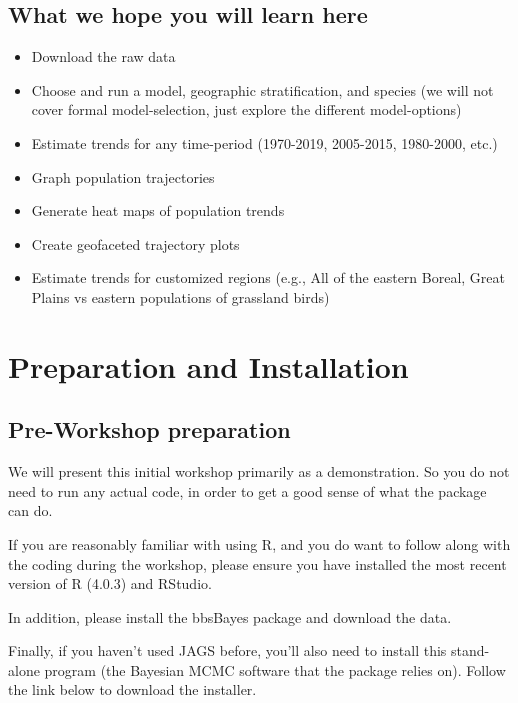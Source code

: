 \documentclass[
]{book}
\begin{document}
\hypertarget{what-we-hope-you-will-learn-here}{%
\section{What we hope you will learn here}\label{what-we-hope-you-will-learn-here}}

\begin{itemize}
\item
  Download the raw data
\item
  Choose and run a model, geographic stratification, and species (we
  will not cover formal model-selection, just explore the different
  model-options)
\item
  Estimate trends for any time-period (1970-2019, 2005-2015,
  1980-2000, etc.)
\item
  Graph population trajectories
\item
  Generate heat maps of population trends
\item
  Create geofaceted trajectory plots
\item
  Estimate trends for customized regions (e.g., All of the eastern
  Boreal, Great Plains vs eastern populations of grassland birds)
\end{itemize}

\hypertarget{Intro}{%
\chapter{Preparation and Installation}\label{Intro}}

\hypertarget{pre-workshop-preparation}{%
\section{Pre-Workshop preparation}\label{pre-workshop-preparation}}

We will present this initial workshop primarily as a demonstration. So you do not need to run any actual code, in order to get a good sense of what the package can do.

If you are reasonably familiar with using R, and you do want to follow along with the coding during the workshop, please ensure you have installed the most recent version of R (4.0.3) and RStudio.

In addition, please install the bbsBayes package and download the data.

Finally, if you haven't used JAGS before, you'll also need to install this stand-alone program (the Bayesian MCMC software that the package relies on). Follow the link below to download the installer.
\end{document}

